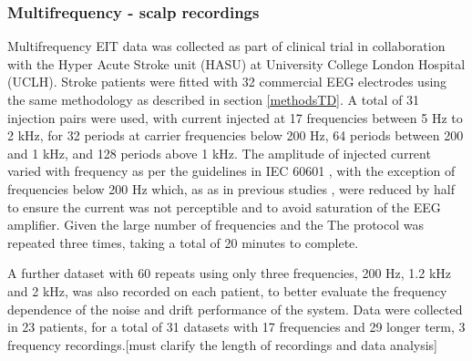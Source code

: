 \subsubsection{Multifrequency - scalp recordings}

Multifrequency EIT data was collected as part of clinical trial in collaboration with the Hyper Acute Stroke unit (HASU) at University College London Hospital (UCLH). Stroke patients were fitted with 32 commercial EEG electrodes using the same methodology as described in section \ref{methodsTD}. A total of 31 injection pairs were used, with current injected at 17 frequencies between 5 Hz to 2 kHz, for 32 periods at carrier frequencies below 200 Hz, 64 periods between 200 and 1 kHz, and 128 periods above 1 kHz. The amplitude of injected current varied with frequency as per the guidelines in IEC 60601 \cite{IEC}, with the exception of frequencies below 200 Hz which, as as in previous studies \cite{McEwan_2006}, were reduced by half to ensure the current was not perceptible and to avoid saturation of the EEG amplifier. Given the large number of frequencies and the The protocol was repeated three times, taking a total of 20 minutes to complete. 

A further dataset with 60 repeats using only three frequencies, 200 Hz, 1.2 kHz and 2 kHz, was also recorded on each patient, to better evaluate the frequency dependence of the noise and drift performance of the system. Data were collected in 23 patients, for a total of 31 datasets with 17 frequencies and 29 longer term, 3 frequency recordings.[must clarify the length of recordings and data analysis] 
